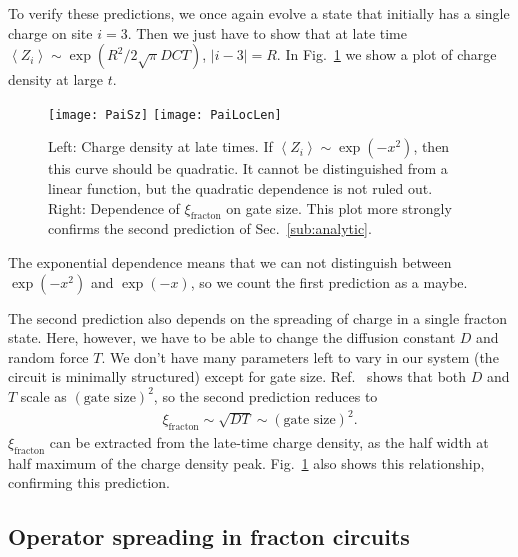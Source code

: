 \documentclass[a4paper,12pt]{article}
\newcommand{\ex}[1]{\left\langle #1 \right\rangle}
\begin{document}
To verify these predictions, we once again evolve a state that initially has a single charge on site $i=3$. Then we just have to show that at late time $\ex{Z_i}\sim\exp(R^2/2\sqrt{\pi}DCT)$, $|i-3|=R$. 
In Fig.~\ref{fig:PaiSz} we show a plot of charge density at large $t$. 
\begin{figure}
	\centering
	\texttt{[image: PaiSz]}
	\texttt{[image: PaiLocLen]}
	\caption{Left: Charge density at late times. If $\ex{Z_i}\sim\exp(-x^2)$, then this curve should be quadratic. It cannot be distinguished from a linear function, but the quadratic dependence is not ruled out. Right: Dependence of $\xi_\text{fracton}$ on gate size. This plot more strongly confirms the second prediction of Sec.~\ref{sub:analytic}.}
	\label{fig:PaiSz}
\end{figure}
The exponential dependence means that we can not distinguish between $\exp(-x^2)$ and $\exp(-x)$, so we count the first prediction as a maybe. 

The second prediction also depends on the spreading of charge in a single fracton state. Here, however, we have to be able to change the diffusion constant $D$ and random force $T$. We don't have many parameters left to vary in our system (the circuit is minimally structured) except for gate size. Ref.~\cite{PaiFracton} shows that both $D$ and $T$ scale as $(\text{gate size})^2$, so the second prediction reduces to
\begin{align}
\xi_\text{fracton}\sim\sqrt{DT}\sim(\text{gate size})^2.
\end{align}
$\xi_\text{fracton}$ can be extracted from the late-time charge density, as the half width at half maximum of the charge density peak.
Fig.~\ref{fig:PaiSz} also shows this relationship, confirming this prediction.

\subsection{Operator spreading in fracton circuits} \label{sub:fracopsp}
\end{document}
